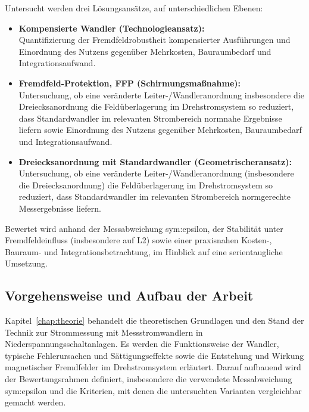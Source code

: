 Untersucht werden drei Lösungsansätze, auf unterschiedlichen Ebenen:
\begin{itemize}
    \item \textbf{Kompensierte Wandler (Technologieansatz):}\\
          Quantifizierung der Fremdfeldrobustheit kompensierter Ausführungen und Einordnung des Nutzens gegenüber Mehrkosten, Bauraumbedarf und Integrationsaufwand.
          
    \item \textbf{Fremdfeld-Protektion, FFP (Schirmungsmaßnahme):}\\
          Untersuchung, ob eine veränderte Leiter-/Wandleranordnung insbesondere die Dreiecksanordnung die Feldüberlagerung im Drehstromsystem so reduziert, dass Standardwandler im relevanten Strombereich normnahe Ergebnisse liefern sowie Einordnung des Nutzens gegenüber Mehrkosten, Bauraumbedarf und Integrationsaufwand.
          
          
    \item \textbf{Dreiecksanordnung mit Standardwandler (Geometrischeransatz):}\\
          Untersuchung, ob eine veränderte Leiter-/Wandleranordnung (insbesondere die Dreiecksanordnung) die Feldüberlagerung im Drehstromsystem so reduziert, dass Standardwandler im relevanten Strombereich normgerechte Messergebnisse liefern.
\end{itemize}

Bewertet wird anhand der Messabweichung \gls{sym:epsilon}, der Stabilität unter Fremdfeldeinfluss (insbesondere auf L2) sowie einer praxisnahen Kosten-, Bauraum- und Integrationsbetrachtung, im Hinblick auf eine serientaugliche Umsetzung.

\subsection{Vorgehensweise und Aufbau der Arbeit}
\label{sec:vorgehensweise}

Kapitel~\ref{chap:theorie} behandelt die theoretischen Grundlagen und den Stand der Technik zur Strommessung mit Messstromwandlern in Niederspannungsschaltanlagen. Es werden die Funktionsweise der Wandler, typische Fehlerursachen und Sättigungseffekte sowie die Entstehung und Wirkung magnetischer Fremdfelder im Drehstromsystem erläutert. Darauf aufbauend wird der Bewertungsrahmen definiert, insbesondere die verwendete Messabweichung \gls{sym:epsilon} und die Kriterien, mit denen die untersuchten Varianten vergleichbar gemacht werden.

